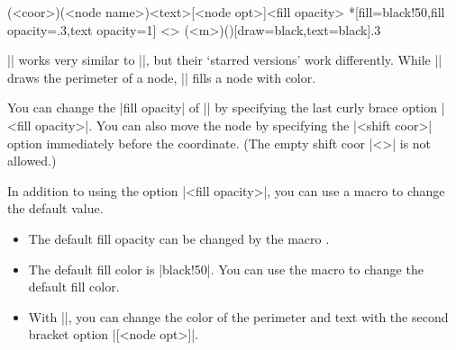
\begin{tzdef}{}
             (<coor>)(<node name>){<text>}[<node opt>]{<fill opacity>}
 *[fill=black!50,fill opacity=.3,text opacity=1] <>
  (<m>)(){}[draw=black,text=black]{.3}
\end{tzdef}

\remark
|\tznodeframe| works very similar to |\tznode|, but their `starred versions' work differently.
While |\tznode*| draws the perimeter of a node, |\tznodeframe*| fills a node with color.

\begin{tzcode}{.3}
\end{tzcode}

You can change the |fill opacity| of |\tznodeframe*| by specifying the last curly brace option |{<fill opacity>}|. You can also move the node by specifying the |<shift coor>| option immediately before the coordinate.
(The empty shift coor |<>| is not allowed.)

\begin{tzcode}{.3}
\end{tzcode}

\remark
In addition to using the option |{<fill opacity>}|, you can use a macro to change the default value.
\begin{itemize}
\item The default fill opacity can be changed by the macro \icmd{\settzfillopacity}.
\item
The default fill color is |black!50|. You can use the macro \icmd{\settzfillcolor} to change the default fill color.
\item With |\tznodeframe|, you can change the color of the perimeter and text with the second bracket option |[<node opt>]|.
\end{itemize}


